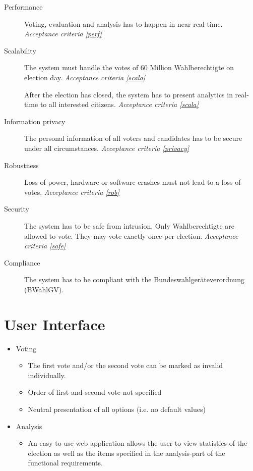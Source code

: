 \documentclass[10pt,a4paper]{article}
\begin{document}
	\begin{description}
		\item[Performance] Voting, evaluation and analysis has to happen in near real-time. 
		\textit{Acceptance criteria \ref{perf}}
		
		\item[Scalability] The system must handle the votes of 60 Million Wahlberechtigte on election day.
		\textit{Acceptance criteria \ref{scala}}
		
		After the election has closed, the system has to present analytics in real-time to all interested citizens. \textit{Acceptance criteria \ref{scala}}
		
		\item[Information privacy] The personal information of all voters and candidates has to be secure under all circumstances. 
		\textit{Acceptance criteria \ref{privacy}}
		
		\item[Robustness] Loss of power, hardware or software crashes must not lead to a loss of votes. 
		\textit{Acceptance criteria \ref{rob}}
		
		\item[Security] The system has to be safe from intrusion. Only Wahlberechtigte are allowed to vote. They may vote exactly once per election. 
		\textit{Acceptance criteria \ref{safe}}
		
		\item[Compliance] The system has to be compliant with the Bundeswahlger\"ateverordnung (BWahlGV). 
		
	\end{description}
	
	\section*{User Interface}
	
	\begin{itemize}
		\item Voting
			\begin{itemize}
				\item The first vote and/or the second vote can be marked as invalid individually.
				\item Order of first and second vote not specified
				\item Neutral presentation of all options (i.e. no default values)
			\end{itemize}
		\item Analysis
			\begin{itemize}
				\item An easy to use web application allows the user to view statistics of the election as well as the items specified in the analysis-part of the functional requirements.
			\end{itemize}
	\end{itemize}
	
\end{document}
